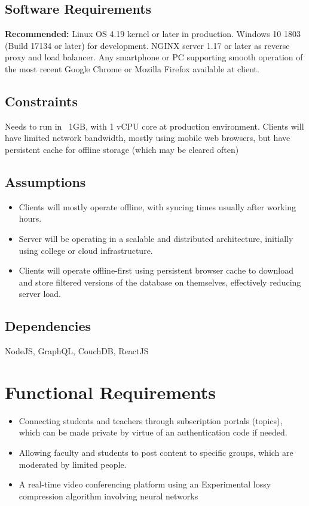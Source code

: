 \subsection{Software Requirements}

\textbf{Recommended:} 
Linux OS 4.19 kernel or later in production.
Windows 10 1803 (Build 17134 or later) for development.
NGINX server 1.17 or later as reverse proxy and load balancer.
Any smartphone or PC supporting smooth operation of the most recent 
Google Chrome or Mozilla Firefox available at client.

\subsection{Constraints}

Needs to run in ~1GB, with 1 vCPU core at production environment.
Clients will have limited network bandwidth, mostly using mobile web browsers, but 
have persistent cache for offline storage (which may be cleared often)

\subsection{Assumptions}

\begin{itemize}
    \item Clients will mostly operate offline, with syncing times usually after working hours.
    \item Server will be operating in a scalable and distributed architecture, 
    initially using college or cloud infrastructure.
    \item Clients will operate offline-first using persistent browser cache to download and store 
    filtered versions of the database on themselves, effectively reducing server load.
\end{itemize}

\subsection{Dependencies}

NodeJS, GraphQL, CouchDB, ReactJS

\section{Functional Requirements}

\begin{itemize}
    \item Connecting students and teachers through subscription portals (topics), 
    which can be made private by virtue of an authentication code if needed.
    \item Allowing faculty and students to post content to specific groups, 
    which are moderated by limited people.
    \item A real-time video conferencing platform using an Experimental 
    lossy compression algorithm involving neural networks
\end{itemize}

